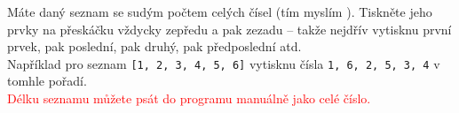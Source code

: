 \question[50]
Máte daný seznam se sudým počtem celých čísel (tím myslím ). Tiskněte jeho prvky na přeskáčku vždycky
zepředu a pak zezadu -- takže nejdřív vytisknu první prvek, pak poslední, pak
druhý, pak předposlední atd.\\
Například pro seznam \texttt{[1, 2, 3, 4, 5, 6]} vytisknu čísla \texttt{1, 6, 2,
	5, 3, 4} v tomhle pořadí.\\
\textcolor{red}{Délku seznamu můžete psát do programu manuálně jako celé číslo.}